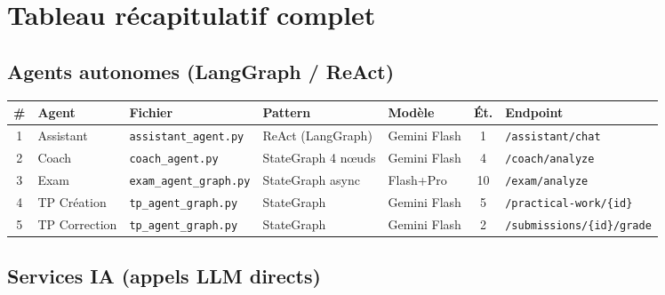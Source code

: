 \documentclass[12pt,a4paper]{article}
\begin{document}
\section{Tableau récapitulatif complet}

\subsection{Agents autonomes (LangGraph / ReAct)}

\begin{longtable}{@{}clp{3cm}p{2.5cm}p{2cm}cp{3cm}@{}}
\toprule
\textbf{\#} & \textbf{Agent} & \textbf{Fichier} & \textbf{Pattern} & \textbf{Modèle} & \textbf{Ét.} & \textbf{Endpoint} \\
\midrule
\endhead
1 & Assistant & \texttt{assistant\_agent.py} & ReAct (LangGraph) & Gemini Flash & 1 & \texttt{/assistant/chat} \\
2 & Coach & \texttt{coach\_agent.py} & StateGraph 4 nœuds & Gemini Flash & 4 & \texttt{/coach/analyze} \\
3 & Exam & \texttt{exam\_agent\_graph.py} & StateGraph async & Flash+Pro & 10 & \texttt{/exam/analyze} \\
4 & TP Création & \texttt{tp\_agent\_graph.py} & StateGraph & Gemini Flash & 5 & \texttt{/practical-work/\{id\}} \\
5 & TP Correction & \texttt{tp\_agent\_graph.py} & StateGraph & Gemini Flash & 2 & \texttt{/submissions/\{id\}/grade} \\
\bottomrule
\end{longtable}

\subsection{Services IA (appels LLM directs)}
\end{document}
